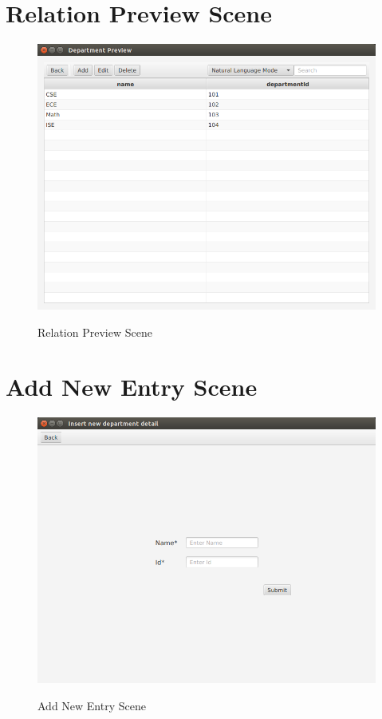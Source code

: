 \section{Relation Preview Scene}
\begin{figure}[H]
\caption{Relation Preview Scene}
\includegraphics[scale=0.6]{./relation_preview.png}
\label{fig:Relation Preview Scene}
\end{figure}

\section{Add New Entry Scene}
\begin{figure}[H]
\caption{Add New Entry Scene}
\includegraphics[scale=0.6]{./add_new_entry.png}
\label{fig:Add New Entry Scene}
\end{figure}

